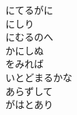 \documentclass[10pt,b5j]{tarticle} %
\begin{document}
\begin{enumerate}
\begin{minipage}[c]{\blocksize}
        \vspace{\linespace}
        \item
        にてるがに\\
        にしり\\
        にむるのへ\\
        かにしぬ\\
        をみれば\\
        いとどまるかな\\
        あらずして\\
        がはとあり
    
    \end{minipage}
\end{enumerate} %
\end{document}
